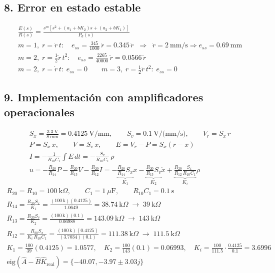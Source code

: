\documentclass[11pt]{article}
\begin{document}
\subsection*{8. Error en estado estable}
\begin{gather*}
\frac{E(s)}{R(s)}=\frac{s^m\left[s^2+(a_1+bK_2)s+(a_2+bK_1)\right]}{P_d(s)}\\
m=1,\; r=\dot r\,t:\quad e_{ss}=\frac{345}{1000}\,\dot r=0.345\,\dot r\;\;\Rightarrow\;\; \dot r=2~\text{mm/s}\Rightarrow e_{ss}=0.69~\text{mm}\\
m=2,\; r=\tfrac12\ddot r\,t^2:\quad e_{ss}=\frac{2265}{40000}\,\ddot r=0.0566\,\ddot r\\
m=2,\; r=\dot r\,t:\; e_{ss}=0\qquad m=3,\; r=\tfrac12\ddot r\,t^2:\; e_{ss}=0
\end{gather*}
\subsection*{9. Implementación con amplificadores operacionales}
\begin{gather*}
S_x=\frac{3.3~\text{V}}{8~\text{mm}}=0.4125~\text{V/mm},\qquad S_v=0.1~\text{V/(mm/s)},\qquad V_r=S_x\,r\\
P=S_x\,x,\qquad V=S_v\,\dot x,\qquad E=V_r-P=S_x(r-x)\\
I=-\frac{1}{R_{10}C_1}\int E\,dt=-\frac{S_x}{R_{10}C_1}\,\rho\\
u=-\frac{R_{20}}{R_{14}}P-\frac{R_{20}}{R_{13}}V-\frac{R_{20}}{R_{12}}I
=-\underbrace{\frac{R_{20}}{R_{14}}S_x}_{K_1}x-\underbrace{\frac{R_{20}}{R_{13}}S_v}_{K_2}\dot x+\underbrace{\frac{R_{20}}{R_{12}}\frac{S_x}{R_{10}C_1}}_{K_i}\rho
\end{gather*}
\begin{gather*}
R_{20}=R_{10}=100~\text{k}\Omega,\qquad C_1=1~\mu\text{F},\qquad R_{10}C_1=0.1~\text{s}\\
R_{14}=\frac{R_{20}S_x}{K_1}=\frac{(100\,\text{k})(0.4125)}{1.0649}=38.74~\text{k}\Omega\;\to\;39~\text{k}\Omega\\
R_{13}=\frac{R_{20}S_v}{K_2}=\frac{(100\,\text{k})(0.1)}{0.06988}=143.09~\text{k}\Omega\;\to\;143~\text{k}\Omega\\
R_{12}=\frac{R_{20}S_x}{K_i\,R_{10}C_1}=\frac{(100\,\text{k})(0.4125)}{(3.7034)(0.1)}=111.38~\text{k}\Omega\;\to\;111.5~\text{k}\Omega\\
K_1=\frac{100}{39}(0.4125)=1.0577,\quad K_2=\frac{100}{143}(0.1)=0.06993,\quad K_i=\frac{100}{111.5}\cdot\frac{0.4125}{0.1}=3.6996\\
\text{eig}(\hat{A}-\hat{B}\hat{K}_{\text{real}})=\{-40.07, -3.97\pm3.03j\}
\end{gather*}
\end{document}
